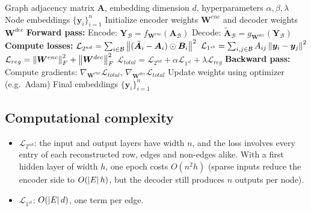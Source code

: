 \begin{notechapter}
\begin{algorithm}
\caption{Training a graph autoencoder (SDNE)}
\begin{algorithmic}[1]
\Require Graph adjacency matrix $\bm{A}$, embedding dimension $d$, hyperparameters $\alpha, \beta, \lambda$
\Ensure Node embeddings $\{\bm{y}_i\}_{i=1}^n$
\State Initialize encoder weights $\bm{W}^{enc}$ and decoder weights $\bm{W}^{dec}$
        \State \textbf{Forward pass:}
        \State \quad Encode: $\bm{Y}_{\mathcal{B}} = f_{\bm{W}^{enc}}(\bm{A}_{\mathcal{B}})$ 
        \State \quad Decode: $\tilde{\bm{A}}_{\mathcal{B}} = g_{\bm{W}^{dec}}(\bm{Y}_{\mathcal{B}})$ 
        \State
        \State \textbf{Compute losses:}
        \State \quad $\mathcal{L}_{2^{nd}} = \sum_{i \in \mathcal{B}} \left\|(\tilde{\bm{A}}_i - \bm{A}_i) \odot \bm{B}_i\right\|^2$
        \State \quad $\mathcal{L}_{1^{st}} = \sum_{i,j \in \mathcal{B}} A_{ij} \left\|\bm{y}_i - \bm{y}_j\right\|^2$
        \State \quad $\mathcal{L}_{reg} = \left\|\bm{W}^{enc}\right\|^2_F + \left\|\bm{W}^{dec}\right\|^2_F$
        \State \quad $\mathcal{L}_{total} = \mathcal{L}_{2^{nd}} + \alpha \mathcal{L}_{1^{st}} + \lambda \mathcal{L}_{reg}$
        \State
        \State \textbf{Backward pass:}
        \State \quad Compute gradients: $\nabla_{\bm{W}^{enc}} \mathcal{L}_{total}$, $\nabla_{\bm{W}^{dec}} \mathcal{L}_{total}$
        \State \quad Update weights using optimizer (e.g.\ Adam)
    \EndFor
\EndFor
\State \Return Final embeddings $\{\bm{y}_i\}_{i=1}^n$
\end{algorithmic}
\end{algorithm}

\subsection{Computational complexity}

\begin{itemize}
    \item \textbf{$\mathcal{L}_{2^{nd}}$}: the input and output layers have width $n$, and the loss involves every entry of each reconstructed row, edges and non-edges alike. With a first hidden layer of width $h$, one epoch costs $O(n^2h)$ (sparse inputs reduce the encoder side to $O(\left|E\right|h)$, but the decoder still produces $n$ outputs per node).
    \item \textbf{$\mathcal{L}_{1^{st}}$}: $O(\left|E\right|d)$, one term per edge.
\end{itemize}


\end{notechapter}
